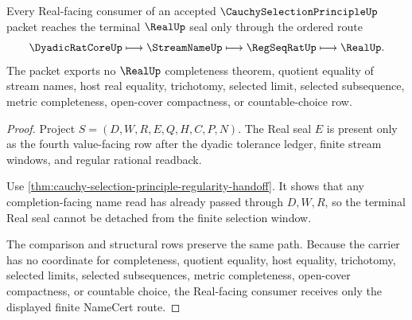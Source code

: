\begin{theorem}
\label{thm:cauchy-selection-principle-real-seal-nonescape}
Every Real-facing consumer of an accepted $\CauchySelectionPrincipleUp$ packet reaches the terminal $\RealUp$ seal only through the ordered route
$$
\DyadicRatCoreUp \longmapsto \StreamNameUp \longmapsto \RegSeqRatUp \longmapsto \RealUp .
$$
The packet exports no $\RealUp$ completeness theorem, quotient equality of stream names, host real equality, trichotomy, selected limit, selected subsequence, metric completeness, open-cover compactness, or countable-choice row.
\end{theorem}
\begin{proof}
Project $S=(D,W,R,E,Q,H,C,P,N)$. The Real seal $E$ is present only as the fourth value-facing row after the dyadic tolerance ledger, finite stream windows, and regular rational readback.

Use \autoref{thm:cauchy-selection-principle-regularity-handoff}. It shows that any completion-facing name read has already passed through $D,W,R$, so the terminal Real seal cannot be detached from the finite selection window.

The comparison and structural rows preserve the same path. Because the carrier has no coordinate for completeness, quotient equality, host equality, trichotomy, selected limits, selected subsequences, metric completeness, open-cover compactness, or countable choice, the Real-facing consumer receives only the displayed finite NameCert route.
\end{proof}




